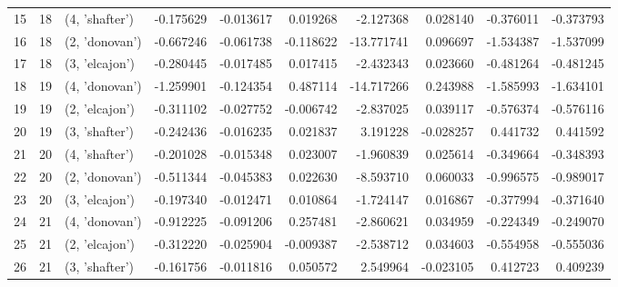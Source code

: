 \begin{tabular}{lrlrrrrrrr}
15 &     18 &  (4, 'shafter') & -0.175629 &  -0.013617 &  0.019268 &   -2.127368 &  0.028140 &  -0.376011 & -0.373793 \\
16 &     18 &  (2, 'donovan') & -0.667246 &  -0.061738 & -0.118622 &  -13.771741 &  0.096697 &  -1.534387 & -1.537099 \\
17 &     18 &  (3, 'elcajon') & -0.280445 &  -0.017485 &  0.017415 &   -2.432343 &  0.023660 &  -0.481264 & -0.481245 \\
18 &     19 &  (4, 'donovan') & -1.259901 &  -0.124354 &  0.487114 &  -14.717266 &  0.243988 &  -1.585993 & -1.634101 \\
19 &     19 &  (2, 'elcajon') & -0.311102 &  -0.027752 & -0.006742 &   -2.837025 &  0.039117 &  -0.576374 & -0.576116 \\
20 &     19 &  (3, 'shafter') & -0.242436 &  -0.016235 &  0.021837 &    3.191228 & -0.028257 &   0.441732 &  0.441592 \\
21 &     20 &  (4, 'shafter') & -0.201028 &  -0.015348 &  0.023007 &   -1.960839 &  0.025614 &  -0.349664 & -0.348393 \\
22 &     20 &  (2, 'donovan') & -0.511344 &  -0.045383 &  0.022630 &   -8.593710 &  0.060033 &  -0.996575 & -0.989017 \\
23 &     20 &  (3, 'elcajon') & -0.197340 &  -0.012471 &  0.010864 &   -1.724147 &  0.016867 &  -0.377994 & -0.371640 \\
24 &     21 &  (4, 'donovan') & -0.912225 &  -0.091206 &  0.257481 &   -2.860621 &  0.034959 &  -0.224349 & -0.249070 \\
25 &     21 &  (2, 'elcajon') & -0.312220 &  -0.025904 & -0.009387 &   -2.538712 &  0.034603 &  -0.554958 & -0.555036 \\
26 &     21 &  (3, 'shafter') & -0.161756 &  -0.011816 &  0.050572 &    2.549964 & -0.023105 &   0.412723 &  0.409239 \\
\bottomrule
\end{tabular}
